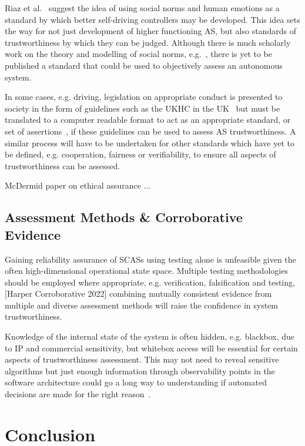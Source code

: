 Riaz et al.~\cite{Riaz2018} suggest the idea of using social norms and human emotions as a standard by which better self-driving controllers may be developed. This idea sets the way for not just development of higher functioning AS, but also standards of trustworthiness by which they can be judged. Although there is much scholarly work on the theory and modelling of social norms, e.g.~\cite{hechter2001social}, there is yet to be published a standard that could be used to objectively assess an autonomous system. 

In some cases, e.g. driving, legislation on appropriate conduct is presented to society in the form of guidelines such as the UKHC in the UK~\cite{highwayCode} but must be translated to a computer readable format to act as an appropriate standard, or set of assertions~\cite{harper2021safety}, if these guidelines can be used to assess AS trustworthiness. A similar process will have to be undertaken for other standards which have yet to be defined, e.g. cooperation, fairness or verifiability, to ensure all aspects of trustworthiness can be assessed. 

McDermid paper on ethical assurance ...



\subsection{Assessment Methods \& Corroborative Evidence} \label{sec:AssFramVis-AssMthds}
Gaining reliability assurance of SCASs using testing alone is unfeasible given the often high-dimensional operational state space. Multiple testing methodologies should be employed where appropriate, e.g. verification, falsification and testing, [Harper Corroborative 2022] combining mutually consistent evidence from multiple and diverse assessment methods will raise the confidence in system trustworthiness.

Knowledge of the internal state of the system is often hidden, e.g. blackbox, due to IP and commercial sensitivity, but whitebox access will be essential for certain aspects of trustworthiness assessment. This may not need to reveal sensitive algorithms but just enough information through observability points in the software architecture could go a long way to understanding if automated decisions are made for the right reason~\cite{koopman2018toward}. 




\section{Conclusion} \label{sec:conc}
